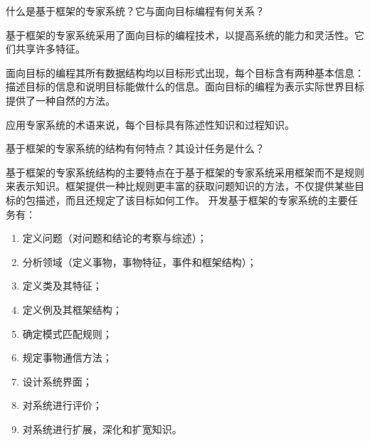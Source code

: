 \begin{question}
什么是基于框架的专家系统？它与面向目标编程有何关系？
\end{question}
\begin{solution}
基于框架的专家系统采用了面向目标的编程技术，以提高系统的能力和灵活性。它们共享许多特征。\par
面向目标的编程其所有数据结构均以目标形式出现，每个目标含有两种基本信息：描述目标的信息和说明目标能做什么的信息。面向目标的编程为表示实际世界目标提供了一种自然的方法。\par
应用专家系统的术语来说，每个目标具有陈述性知识和过程知识。 
\end{solution}

\begin{question}
基于框架的专家系统的结构有何特点？其设计任务是什么？
\end{question}
\begin{solution}
基于框架的专家系统结构的主要特点在于基于框架的专家系统采用框架而不是规则来表示知识。框架提供一种比规则更丰富的获取问题知识的方法，不仅提供某些目标的包描述，而且还规定了该目标如何工作。 
开发基于框架的专家系统的主要任务有：
	\begin{enumerate}
		\item 定义问题（对问题和结论的考察与综述）；
		\item 分析领域（定义事物，事物特征，事件和框架结构）；
		\item 定义类及其特征；
		\item 定义例及其框架结构；
		\item 确定模式匹配规则；
		\item 规定事物通信方法；
		\item 设计系统界面；
		\item 对系统进行评价；
		\item 对系统进行扩展，深化和扩宽知识。
	\end{enumerate}
\end{solution}

